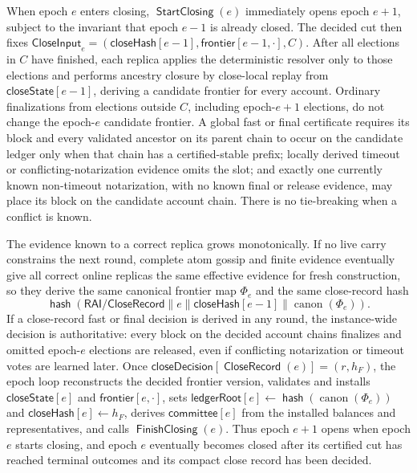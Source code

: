 \documentclass[sigplan,twocolumn,review,anonymous]{acmart}
\newcommand{\func}[1]{\operatorname{\mathsf{#1}}}
\newcommand{\hash}{\func{hash}}
\newcommand{\CloseRecord}{\func{CloseRecord}}
\newcommand{\closeDecision}{\mathsf{closeDecision}}
\newcommand{\StartClosing}{\func{StartClosing}}
\newcommand{\FinishClosing}{\func{FinishClosing}}
\newcommand{\frontier}{\mathsf{frontier}}
\newcommand{\ledgerRoot}{\mathsf{ledgerRoot}}
\newcommand{\closeHash}{\mathsf{closeHash}}
\newcommand{\committee}{\mathsf{committee}}
\newcommand{\closeState}{\mathsf{closeState}}
\begin{document}
When epoch \(e\) enters closing, \(\StartClosing(e)\) immediately opens epoch \(e+1\), subject to
the invariant that epoch \(e-1\) is already closed.  The decided cut then fixes
\(\mathsf{CloseInput}_e=(\closeHash[e-1],\frontier[e-1,\cdot],C)\).  After all elections in \(C\) have
finished, each replica applies the deterministic resolver only to those elections and performs ancestry
closure by close-local replay from \(\closeState[e-1]\), deriving a candidate frontier for every
account.  Ordinary finalizations from elections outside \(C\), including epoch-\(e+1\) elections, do not
change the epoch-\(e\) candidate frontier.  A global fast or final certificate requires its block
and every validated ancestor on its parent chain to occur on the candidate ledger only when that chain
has a certified-stable prefix; locally derived timeout or conflicting-notarization evidence omits the
slot; and exactly one currently known non-timeout notarization, with no known final or release evidence,
may place its block on the candidate account chain.  There is no tie-breaking when a conflict is known.

The evidence known to a correct replica grows monotonically.  If no live carry constrains the next
round, complete atom gossip and finite evidence eventually give all correct online replicas the same
effective evidence for fresh construction, so they derive the same canonical frontier map \(\Phi_e\)
and the same close-record hash
\[
\hash(\mathsf{RAI/CloseRecord}\parallel e\parallel\closeHash[e-1]
\parallel\operatorname{canon}(\Phi_e)).
\]
If a close-record fast or final decision is derived in any round, the instance-wide decision is authoritative:
every block on the decided account chains finalizes and omitted epoch-\(e\) elections are released, even
if conflicting notarization or timeout votes are learned later.  Once
\(\closeDecision[\CloseRecord(e)]=(r,h_F)\), the epoch loop reconstructs the decided frontier version,
validates and installs \(\closeState[e]\) and \(\frontier[e,\cdot]\), sets
\(\ledgerRoot[e]\gets\hash(\operatorname{canon}(\Phi_e))\) and \(\closeHash[e]\gets h_F\), derives
\(\committee[e]\) from the installed balances and representatives, and calls \(\FinishClosing(e)\).  Thus epoch \(e+1\) opens when epoch \(e\)
starts closing, and epoch \(e\) eventually becomes closed after its certified cut has reached terminal
outcomes and its compact close record has been decided.
\end{document}
